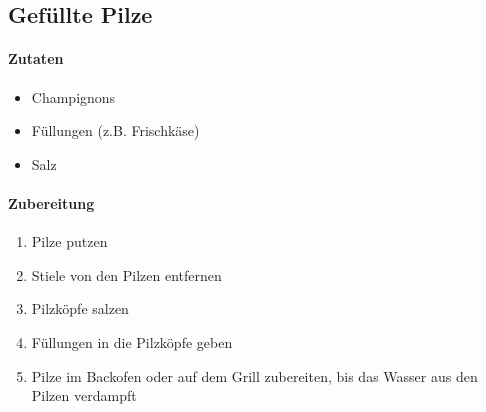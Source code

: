 \newpage
\subsection{Gefüllte Pilze}
\paragraph{Zutaten}
\begin{itemize}[noitemsep]
	\item Champignons
	\item Füllungen (z.B. Frischkäse)
	\item Salz
\end{itemize}
\paragraph{Zubereitung}
\begin{enumerate}[noitemsep]
	\item Pilze putzen
	\item Stiele von den Pilzen entfernen
	\item Pilzköpfe salzen
	\item Füllungen in die Pilzköpfe geben
	\item Pilze im Backofen oder auf dem Grill zubereiten, bis das Wasser aus den Pilzen verdampft
\end{enumerate}
